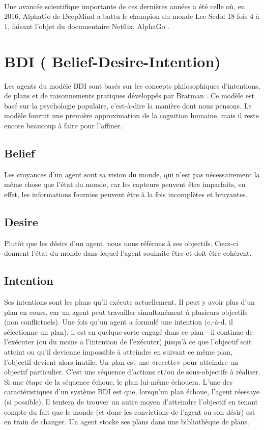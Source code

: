 ~\par
Une avancée scientifique importante de ces dernières années a été celle où, en 2016, AlphaGo de DeepMind a battu le champion du monde Lee Sedol 18 fois 4 à 1, faisant l’objet du documentaire Netflix, AlphaGo \parencite{unity2}. 



\section{BDI ( Belief-Desire-Intention)}

Les agents du modèle BDI sont basés sur les concepts philosophiques d'intentions, de plans et de raisonnements pratiques développés par Bratman \parencite{bratman1987intention}. Ce modèle est basé sur la psychologie populaire, c'est-à-dire la manière dont nous pensons. Le modèle fournit une première approximation de la cognition humaine, mais il reste encore beaucoup à faire pour l’affiner.


\subsection{Belief}

Les croyances d'un agent sont sa vision du monde, qui n'est pas nécessairement la même chose que l'état du monde, car les capteurs peuvent être imparfaits, en effet, les informations fournies peuvent être à la fois incomplètes et bruyantes.

\subsection{Desire}

Plutôt que les désirs d’un agent, nous nous référons à ses objectifs. Ceux-ci donnent l'état du monde dans lequel l'agent souhaite être et doit être cohérent.


\subsection{Intention}

Ses intentions sont les plans qu'il exécute actuellement. Il peut y avoir plus d'un plan en cours, car un agent peut travailler simultanément à plusieurs objectifs (non conflictuels). Une fois qu'un agent a formulé une intention (c.-à-d. il sélectionne un plan), il est en quelque sorte engagé dans ce plan - il continue de l'exécuter (ou du moins a l'intention de l'exécuter) jusqu'à ce que l'objectif soit atteint ou qu’il devienne impossible à atteindre en suivant ce même plan, l'objectif devient alors inutile. 
Un plan est une «recette» pour atteindre un objectif particulier. C'est une séquence d'actions et/ou de sous-objectifs à réaliser. Si une étape de la séquence échoue, le plan lui-même échouera. L'une des caractéristiques d'un système BDI est que, lorsqu'un plan échoue, l'agent réessaye (si possible). Il tentera de trouver un autre moyen d’atteindre l’objectif en tenant compte du fait que le monde (et donc les convictions de l’agent ou son désir) est en train de changer. Un agent stocke ses plans dans une bibliothèque de plans.


